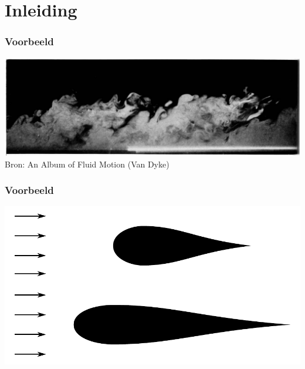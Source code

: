 \documentclass[t]{beamer}
\subtitle{Grenslagen en turbulentie}
\begin{document}
	\frame{\titlepage}
	\section{Inleiding}
	\begin{frame}
		\frametitle{Voorbeeld}
		\center
		\vspace{1cm}
    	\includegraphics[width=\textwidth]{fig/uitwendige_stroming/Turbulent_boundary_layer_Falco1977.png}\\
		\footnotesize{Bron: An Album of Fluid Motion (Van Dyke)}
  	\end{frame}
  	\begin{frame}
		\frametitle{Voorbeeld}
		\center
    	\includegraphics[width=\textwidth]{fig/uitwendige_stroming/Oppervlakteweerstand}\\
  	\end{frame}
\end{document}
